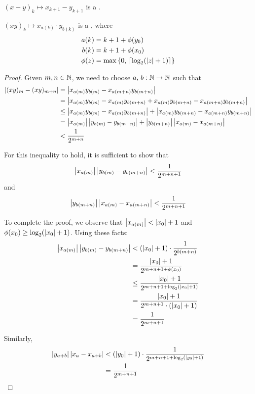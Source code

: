 \documentclass[leqno]{report}
\begin{document}
\begin{Corollary}[Subtraction]
    $(x-y)_k \mapsto x_{k+1} - y_{k+1}$ is a \FCCS.
\end{Corollary}

\begin{Proposition}[Multiplication]
    $(xy)_k \mapsto x_{a(k)} \cdot y_{b(k)}$ is a \FCCS, where
    \begin{align*}
        a(k) &= k + 1 + \phi(y_0) \\
        b(k) &= k + 1 + \phi(x_0) \\
        \phi(z) &= \max \left\{  0,\, \left\lceil \log_2(\left| z \right| + 1) \right\rceil  \right\}
    \end{align*}
\end{Proposition}

\begin{proof}
    Given $m, n \in \mathbb{N}$, we need to choose $a,\, b : \mathbb{N} \rightarrow \mathbb{N}$ such that
    \begin{align*}
        \left| (xy)_m - (xy)_{m+n} \right|
        &= \left| x_{a(m)} y_{b(m)} - x_{a(m+n)} y_{b(m+n)} \right| \\
        &= \left| x_{a(m)} y_{b(m)} - x_{a(m)} y_{b(m+n)} + x_{a(m)} y_{b(m+n)} - x_{a(m+n)} y_{b(m+n)} \right| \\
        &\leq \left| x_{a(m)} y_{b(m)} - x_{a(m)} y_{b(m+n)} \right| + \left| x_{a(m)} y_{b(m+n)} - x_{a(m+n)} y_{b(m+n)} \right| \\
        &= \left| x_{a(m)} \right|\left| y_{b(m)} - y_{b(m+n)} \right| + \left| y_{b(m+n)} \right|\left| x_{a(m)} - x_{a(m+n)} \right| \\
        &< \frac{1}{2^{m+n}}
    \end{align*}

    For this inequality to hold, it is sufficient to show that
    \[ \left| x_{a(m)} \right|\left| y_{b(m)} - y_{b(m+n)} \right| < \frac{1}{2^{m+n+1}} \]
    and
    \[ \left| y_{b(m+n)} \right|\left| x_{a(m)} - x_{a(m+n)} \right| < \frac{1}{2^{m+n+1}} \]

    To complete the proof, we observe that $\left| x_{a(m)} \right| < \left| x_0 \right| + 1$ and $\phi(x_0) \geq \log_2(\left| x_0 \right| + 1)$. Using these facts:
    \begin{align*}
        \left| x_{a(m)} \right|\left| y_{b(m)} - y_{b(m+n)} \right|
        &< (\left| x_0 \right| + 1) \cdot \frac{1}{2^{b(m+n)}} \\
        &= \frac{\left| x_0 \right| + 1}{2^{m + n + 1 + \phi(x_0)}} \\
        &\leq \frac{\left| x_0 \right| + 1}{2^{m + n + 1 + \log_2(\left| x_0 \right| + 1)}} \\
        &= \frac{\left| x_0 \right| + 1}{2^{m + n + 1} \cdot (\left| x_0 \right| + 1)} \\
        &= \frac{1}{2^{m + n + 1}}
    \end{align*}

    Similarly,
    \begin{align*}
        \left| y_{a+b} \right|\left| x_a - x_{a+b} \right|
        &< (\left| y_0 \right| + 1) \cdot \frac{1}{2^{m + n + 1 + \log_2(\left| y_0 \right| + 1)}} \\
        &= \frac{1}{2^{m + n + 1}}
    \end{align*}
\end{proof}
\end{document}
